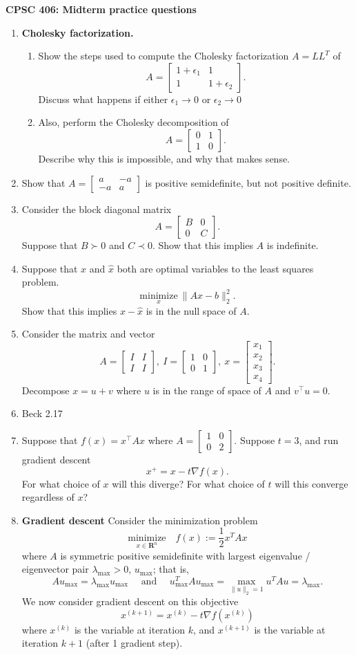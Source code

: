 \documentclass{article}
\newcommand{\mypagebreak}{\begin{center}
		\noindent\makebox[\linewidth]{\rule{7.5in}{1pt}}
	\end{center}}
\newcommand{\minimize}[1]{\underset{#1}{\mathrm{minimize}}}
\renewcommand{\Re}{\mathbf R}
\newcommand{\bmat}{\left[\begin{matrix}}
\newcommand{\emat}{\end{matrix}\right]}
\begin{document}
{\Large\textbf{CPSC 406: Midterm practice questions \hfill }}


\mypagebreak



\begin{enumerate}
	\item \textbf{Cholesky factorization.} 
	
	\begin{enumerate}
		\item Show the steps used to compute the Cholesky factorization $A = LL^T$ of 
		\[
		A = \bmat 1 + \epsilon_1 & 1 \\ 1 & 1 + \epsilon_2 \emat.
		\]
		Discuss what happens if either $\epsilon_1\to 0$ or $\epsilon_2 \to 0$
		
		\item Also, perform the Cholesky decomposition of 
		\[
		A = \bmat 0 & 1 \\ 1 &  0 \emat.
		\]
		Describe why this is impossible, and why that makes sense. 
	\end{enumerate}
	\item Show that $A = \bmat a& -a \\ -a &a\emat$ is positive semidefinite, but not positive definite.
	\item Consider the block diagonal matrix 
			$$A = \bmat B&0\\0&C\emat.$$
			Suppose that $B\succ	 0$ and {\color{red} $C\prec 0$}. Show that this implies $A$ is indefinite.
	\item Suppose that $x$ and $\hat{x}$ both are optimal variables to the least squares problem.
			$$\minimize{x}\ \|Ax-b\|_2^2.$$
			Show that this implies $x-\hat{x}$ is in the null space of $A$.
	\item Consider the matrix and vector 
			$$A = \bmat I&I\\I&I\emat, \ I =\bmat 1&0\\0&1\emat,\ x = \bmat x_1\\x_2\\x_3\\x_4\emat.$$
			Decompose $x = u+v$ where $u$ is in the range of space of $A$ and $v^\intercal u = 0$.
	\item Beck 2.17
	\item Suppose that $f(x) = x^\intercal Ax$ where $A = \bmat 1&0\\0&2 \emat$. Suppose $t=3$, and run gradient descent
			$$x^+ = x - t\nabla f(x).$$
			For what choice of $x$ will this diverge? For what choice of $t$ will this converge regardless of $x$?			
	\item \textbf{Gradient descent} Consider the minimization problem
	\[
	\minimize{x\in \Re^n} \quad f(x) := \frac{1}{2} x^TAx 
	\]
	where $A$ is symmetric positive semidefinite with largest eigenvalue / eigenvector pair $\lambda_{\max}>0$, $u_{\max}$; that is, 
	\[
	Au_{\max} = \lambda_{\max} u_{\max} \quad \text{ and } \quad u_{\max}^TAu_{\max} = \max_{\|u\|_2=1} u^TAu = \lambda_{\max}.
	\]
	We now consider gradient descent on this objective
	\[
	x^{(k+1)} = x^{(k)} - t \nabla f(x^{(k)})
	\]
where $x^{(k)}$ is the variable at iteration $k$, and $x^{(k+1)}$ is the variable at iteration $k+1$ (after 1 gradient step).
	

\end{enumerate}
\end{document}
